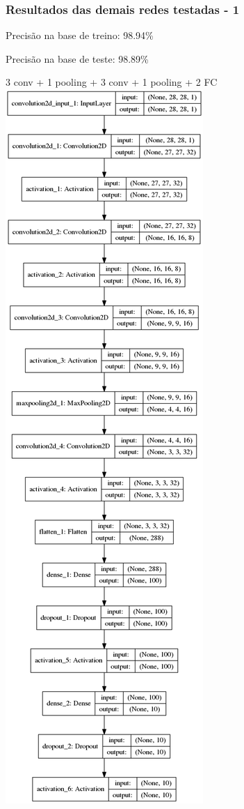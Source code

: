 \documentclass[tikz,10pt]{beamer}
\begin{document}
\begin{frame}
	\frametitle{Resultados das demais redes testadas - 1 }
	\centering
	\par Precisão na base de treino: 98.94\%
	\par Precisão na base de teste: 98.89\%
	\par 3 conv + 1 pooling + 3 conv + 1 pooling + 2 FC 
	\\
	\includegraphics[height=.7\paperheight]{images/resultados/network_1/model}
\end{frame}
\end{document}
